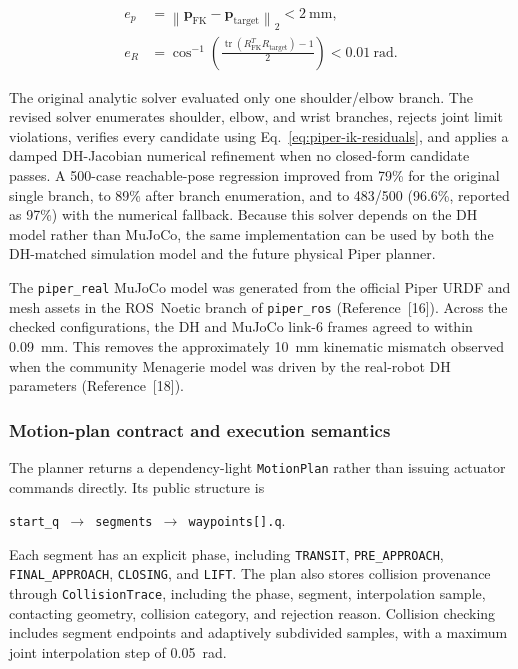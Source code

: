 \begin{align}
e_p &= \left\|\mathbf p_{\mathrm{FK}}-\mathbf p_{\mathrm{target}}\right\|_2
      < 2\ \mathrm{mm}, \\
e_R &= \cos^{-1}\!\left(\frac{\operatorname{tr}
      (R_{\mathrm{FK}}^{T}R_{\mathrm{target}})-1}{2}\right)
      < 0.01\ \mathrm{rad}.
\label{eq:piper-ik-residuals}
\end{align}

The original analytic solver evaluated only one shoulder/elbow branch.  The
revised solver enumerates shoulder, elbow, and wrist branches, rejects joint
limit violations, verifies every candidate using Eq.~\ref{eq:piper-ik-residuals},
and applies a damped DH-Jacobian numerical refinement when no closed-form
candidate passes.  A 500-case reachable-pose regression improved from 79\%
for the original single branch, to 89\% after branch enumeration, and to
483/500 (96.6\%, reported as 97\%) with the numerical fallback.  Because this
solver depends on the DH model rather than MuJoCo, the same implementation can
be used by both the DH-matched simulation model and the future physical Piper
planner.

The \texttt{piper\_real} MuJoCo model was generated from the official Piper
URDF and mesh assets in the ROS~Noetic branch of \texttt{piper\_ros}
(Reference~[16]). Across the checked configurations, the DH and MuJoCo link-6
frames agreed to within 0.09~mm. This removes the approximately 10~mm
kinematic mismatch observed when the community Menagerie model was driven by
the real-robot DH parameters (Reference~[18]).

\subsubsection{Motion-plan contract and execution semantics}

The planner returns a dependency-light \texttt{MotionPlan} rather than
issuing actuator commands directly. Its public structure is

\begin{center}
\texttt{start\_q $\rightarrow$ segments $\rightarrow$ waypoints[].q}.
\end{center}

Each segment has an explicit phase, including \texttt{TRANSIT},
\texttt{PRE\_APPROACH}, \texttt{FINAL\_APPROACH}, \texttt{CLOSING}, and
\texttt{LIFT}.  The plan also stores collision provenance through
\texttt{CollisionTrace}, including the phase, segment, interpolation sample,
contacting geometry, collision category, and rejection reason. Collision
checking includes segment endpoints and adaptively subdivided samples, with a
maximum joint interpolation step of 0.05~rad.

